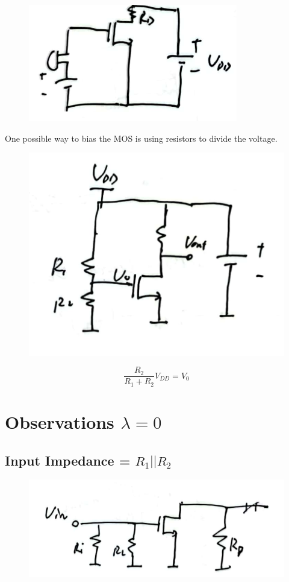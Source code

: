 \documentclass[fontset=windows]{article}
\begin{document}
\begin{figure}[htbp]
    \centering
    \includegraphics[scale=0.6]{3.jpg}
    \captionsetup{labelformat=empty}
    \caption{}
    \label{3}
\end{figure}

One possible way to bias the MOS is using resistors to divide the voltage. 

\begin{figure}[htbp]
    \centering
    \includegraphics[scale=0.6]{4.jpg}
    \captionsetup{labelformat=empty}
    \caption{}
    \label{4}
\end{figure}

$$\frac{R_2}{R_1+R_2}V_{DD}=V_0$$

\section*{Observations $\lambda=0$}

\subsection*{Input Impedance = $R_1||R_2$}

\begin{figure}[htbp]
    \centering
    \includegraphics[scale=0.6]{5.jpg}
    \captionsetup{labelformat=empty}
    \caption{}
    \label{5}
\end{figure}
\end{document}
